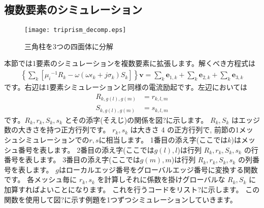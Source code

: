 \subsection{複数要素のシミュレーション}

\begin{figure}[b]
\begin{center}
\texttt{[image: triprism\_decomp.eps]}
\caption{三角柱を3つの四面体に分解}
\end{center}
\end{figure}

本節では1要素のシミュレーションを複数要素に拡張します。解くべき方程式は
\begin{align}
\left\{
\sum_k
\left[
{\mu_i}^{-1} R_k
-\omega\left(\omega\epsilon_k+j\sigma_k\right)S_k
\right]
\right\}
\textbf{v}
=\sum_k \textbf{e}_{1,k}+\sum_k\textbf{e}_{2,k}+\sum_k\textbf{e}_{3,k}
\end{align}
です。右辺は1要素シミュレーションと同様の電流励起です。左辺においては
\begin{align}
R_{k,g(l),g(m)} &= r_{k,l,m}\\
S_{k,g(l),g(m)} &= s_{k,l,m}
\end{align}
です。$R_k, r_k, S_k, s_k$ とその添字(そえじ)の関係を図?に示します。
$R_k, S_k$ はエッジ数の大きさを持つ正方行列です。
$r_k, s_k$ は大きさ 4 の正方行列で,
前節の1メッシュシミュレーションでの$r, s$に相当します。
1番目の添え字(ここでは$k$)はメッシュ番号を表します。
2番目の添え字(ここでは$g(l), l$)は行列
$R_k, r_k, S_k, s_k$ の行番号を表します。
3番目の添え字(ここでは$g(m), m$)は行列
$R_k, r_k, S_k, s_k$ の列番号を表します。
$g$はローカルエッジ番号をグローバルエッジ番号に変換する関数です。
各メッシュ毎に $r_k, s_k$ を計算しそれに係数を掛けグローバルな
$R_k, S_k$ に加算すればよいことになります。
これを行うコードをリスト?に示します。
この関数を使用して図?に示す例題を1つずつシミュレーションしていきます。
